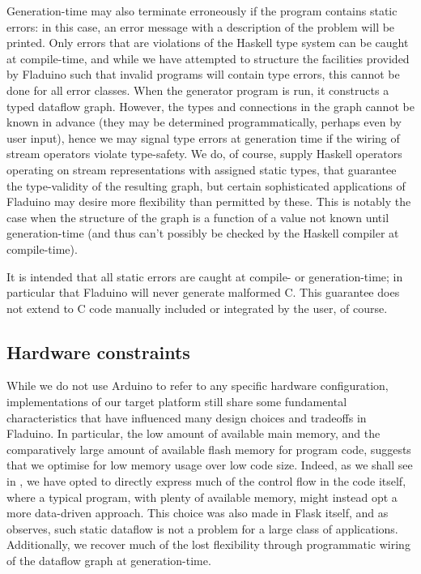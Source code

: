 \documentclass[a4paper, oneside, final]{memoir}
\let\fref\undefined
\begin{document}
Generation-time may also terminate erroneously if the program contains
static errors: in this case, an error message with a description of
the problem will be printed.  Only errors that are violations of the
Haskell type system can be caught at compile-time, and while we have
attempted to structure the facilities provided by Fladuino such that
invalid programs will contain type errors, this cannot be done for all
error classes.  When the generator program is run, it constructs a
typed dataflow graph.  However, the types and connections in the graph
cannot be known in advance (they may be determined
pro\-gram\-mati\-cally, perhaps even by user input), hence we may
signal type errors at generation time if the wiring of stream
operators violate type-safety.  We do, of course, supply Haskell
operators operating on stream representations with assigned static
types, that guarantee the type-validity of the resulting graph, but
certain sophisticated applications of Fladuino may desire more
flexibility than permitted by these.  This is notably the case when
the structure of the graph is a function of a value not known until
generation-time (and thus can't possibly be checked by the Haskell
compiler at compile-time).

It is intended that all static errors are caught at compile- or
generation-time; in particular that Fladuino will never generate
malformed C.  This guarantee does not extend to C code manually
included or integrated by the user, of course.

\subsection{Hardware constraints}

While we do not use Arduino to refer to any specific hardware
configuration, implementations of our target platform still share some
fundamental characteristics that have influenced many design choices
and tradeoffs in Fladuino.  In particular, the low amount of available
main memory, and the comparatively large amount of available flash
memory for program code, suggests that we optimise for low memory
usage over low code size.  Indeed, as we shall see in
\fref{sec:dataflowtranslation}, we have opted to directly express much of
the control flow in the code itself, where a typical program, with
plenty of available memory, might instead opt a more data-driven
approach.  This choice was also made in Flask itself, and as
\cite{flask08} observes, such static dataflow is not a problem for a
large class of applications.  Additionally, we recover much of the
lost flexibility through programmatic wiring of the dataflow graph at
generation-time.
\end{document}
